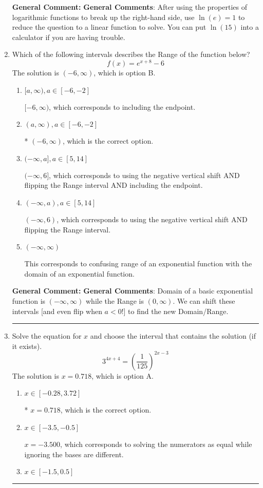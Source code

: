 \documentclass{extbook}[14pt]
\newcommand{\litem}[1]{\item #1

\rule{\textwidth}{0.4pt}}
\begin{document}
\begin{enumerate}
{\textbf{General Comment:} \textbf{General Comments}: After using the properties of logarithmic functions to break up the right-hand side, use $\ln(e) = 1$ to reduce the question to a linear function to solve. You can put $\ln(15)$ into a calculator if you are having trouble.
}
\litem{
Which of the following intervals describes the Range of the function below?
\[ f(x) = e^{x+8}-6 \]The solution is \( (-6, \infty) \), which is option B.\begin{enumerate}[label=\Alph*.]
\item \( [a, \infty), a \in [-6, -2] \)

$[-6, \infty)$, which corresponds to including the endpoint.
\item \( (a, \infty), a \in [-6, -2] \)

* $(-6, \infty)$, which is the correct option.
\item \( (-\infty, a], a \in [5, 14] \)

$(-\infty, 6]$, which corresponds to using the negative vertical shift AND flipping the Range interval AND including the endpoint.
\item \( (-\infty, a), a \in [5, 14] \)

$(-\infty, 6)$, which corresponds to using the negative vertical shift AND flipping the Range interval.
\item \( (-\infty, \infty) \)

This corresponds to confusing range of an exponential function with the domain of an exponential function.
\end{enumerate}

\textbf{General Comment:} \textbf{General Comments}: Domain of a basic exponential function is $(-\infty, \infty)$ while the Range is $(0, \infty)$. We can shift these intervals [and even flip when $a<0$!] to find the new Domain/Range.
}
\litem{
Solve the equation for $x$ and choose the interval that contains the solution (if it exists).
\[ 3^{4x+4} = \left(\frac{1}{125}\right)^{2x-3} \]The solution is \( x = 0.718 \), which is option A.\begin{enumerate}[label=\Alph*.]
\item \( x \in [-0.28, 3.72] \)

* $x = 0.718$, which is the correct option.
\item \( x \in [-3.5, -0.5] \)

$x = -3.500$, which corresponds to solving the numerators as equal while ignoring the bases are different.
\item \( x \in [-1.5, 0.5] \)


\end{enumerate}}
\end{enumerate}
\end{document}

